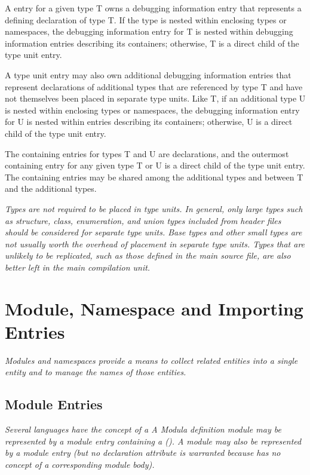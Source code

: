 A  entry for a given type T owns a debugging
information entry that represents a defining declaration
of type T. If the type is nested within enclosing types or
namespaces, the debugging information entry for T is nested
within debugging information entries describing its containers;
otherwise, T is a direct child of the type unit entry.

A type unit entry may also own additional debugging information
entries that represent declarations of additional types that
are referenced by type T and have not themselves been placed in
separate type units. Like T, if an additional type U is nested
within enclosing types or namespaces, the debugging information
entry for U is nested within entries describing its containers;
otherwise, U is a direct child of the type unit entry.

The containing entries for types T and U are declarations,
and the outermost containing entry for any given type T or
U is a direct child of the type unit entry. The containing
entries may be shared among the additional types and between
T and the additional types.

\textit{Types are not required to be placed in type units. In general,
only large types such as structure, class, enumeration, and
union types included from header files should be considered
for separate type units. Base types and other small types
are not usually worth the overhead of placement in separate
type units. Types that are unlikely to be replicated, such
as those defined in the main source file, are also better
left in the main compilation unit.}

\section{Module, Namespace and Importing Entries}
\textit{Modules and namespaces provide a means to collect related
entities into a single entity and to manage the names of
those entities.}

\subsection{Module Entries}
\label{chap:moduleentries}
\textit{Several languages have the concept of a 
A Modula definition module 
may be represented by a module
entry containing a 
(). A
 module 
may also be represented by a module entry
(but no declaration attribute is warranted because 
has no concept of a corresponding module body).}


